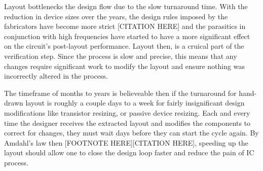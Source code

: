 Layout bottlenecks the design flow due to the slow turnaround time. With the reduction in device sizes over the years, the design rules imposed by the fabricators have become more strict [CITATION HERE] and the parasitics in conjunction with high frequencies have started to have a more significant effect on the circuit's post-layout performance. Layout then, is a cruical part of the verification step. Since the process is slow and precise, this means that any changes require significant work to modify the layout and ensure nothing was incorrectly altered in the process.

The timeframe of months to years is believeable then if the turnaround for hand-drawn layout is roughly a couple days to a week for fairly insignificant design modifications like transistor resizing, or passive device resizing. Each and every time the designer receives the extracted layout and modifies the components to correct for changes, they must wait days before they can start the cycle again. By Amdahl's law then [FOOTNOTE HERE][CITATION HERE], speeding up the layout should allow one to close the design loop faster and reduce the pain of IC process.
%





